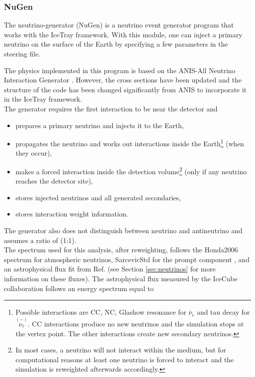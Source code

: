 \subsubsection{NuGen}
The neutrino-generator (NuGen) is a neutrino event generator program that works with the IceTray framework. With this module, one can inject a primary neutrino on the surface of the Earth by specifying a few parameters in the steering file.

The physics implemented in this program is based on the ANIS-All Neutrino Interaction Generator \cite{Gazizov:2004va}. However, the cross sections have been updated and the structure of the code has been changed significantly from ANIS to incorporate it in the IceTray framework.\\

\noindent The generator requires the first interaction to be near the detector and

\newcommand\barparen[1]{\overset{(-)}{#1}}

\begin{itemize}
\item prepares a primary neutrino and injects it to the Earth,
\item propagates the neutrino and works out interactions inside the Earth\footnote{Possible interactions are CC, NC, Glashow resonance for $\bar{\nu}_e$ and tau decay for $\barparen{\nu_\tau}$. CC interactions produce no new neutrinos and the simulation stops at the vertex point. The other interactions create new secondary neutrinos.} (when they occur),
\item makes a forced interaction inside the detection volume\footnote{
In most cases, a neutrino will not interact within the medium, but for computational reasons at least one neutrino is forced to interact and the simulation is reweighted afterwards accordingly.} (only if any neutrino reaches the detector site),
\item stores injected neutrinos and all generated secondaries,
\item stores interaction weight information.
\end{itemize}
\vspace{3mm}
\noindent The generator also does not distinguish between neutrino and antineutrino and assumes a ratio of (1:1).\\

\noindent The spectrum used for this analysis, after reweighting, follows the Honda2006 spectrum \cite{Honda:2006qj} for atmospheric neutrinos, SarcevicStd for the prompt component \cite{Enberg:2008te}, and an astrophysical flux fit from Ref. \cite{Aartsen:2014gkd} (see Section \ref{sec:neutrinos} for more information on these fluxes). The astrophysical flux measured by the IceCube collaboration follows an energy spectrum equal to

